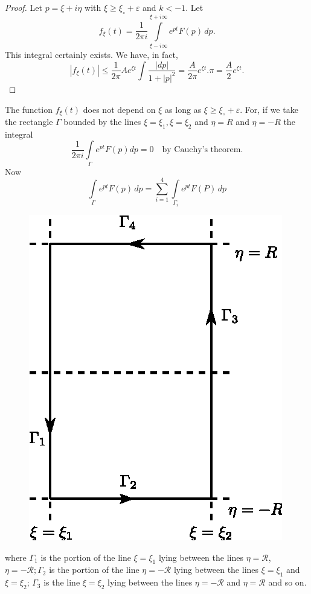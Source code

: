 \begin{proof}
Let $p = \xi + i \eta$ with $\xi \geq \xi_\circ + \varepsilon$ and 
$k < -1$. Let 
$$
f_\xi(t) = \frac{1}{2\pi i}\int\limits_{\xi-i\infty}^{\xi+i\infty}
e^{pt} F(p)\, dp.
$$
This integral certainly exists. We have, in fact,
$$
|f_\xi(t)|\leq \frac{1}{2\pi}Ae^{\xi t}
\int\frac{|dp|}{1+|p|^2}=\frac{A}{2\pi} e^{\xi t}.\pi =
\frac{A}{2}e^{\xi t}.
$$
\end{proof}

The function $f_\xi(t)$ does not depend on $\xi$ as long as $\xi \geq
\xi_\circ + \varepsilon$. For, if we take the rectangle $\Gamma$ bounded by
the lines $\xi = \xi_1, \xi = \xi_2$ and $\eta = R$ and $\eta = -R$
the integral
$$
\frac{1}{2\pi i}\int\limits_\Gamma e^{pt} F(p) dp = 0\quad \text{by
  Cauchy's theorem.}
$$
Now
$$
\int\limits_\Gamma e^{pt}F(p)\,dp =
\sum\limits_{i=1}^4\int\limits_{\Gamma_i}e^{pt} F(P)\,dp
$$

\begin{figure}[H]
\centering
\includegraphics[scale=.9]{fig1.eps}
\end{figure}
where $\Gamma_1$ is the portion of the line $\xi = \xi_1$ lying
between the lines $\eta = \mathcal{R}$, $\eta = -\mathcal{R};
\Gamma_2$ is the portion of the line $\eta = -\mathcal{R}$ lying
between the lines $\xi = \xi_1$ and $\xi = \xi_2;\, \Gamma_3$ is the
line $\xi = \xi_2$ lying between the lines $\eta = -\mathcal{R}$ and
$\eta = \mathcal{R}$ and so on.

